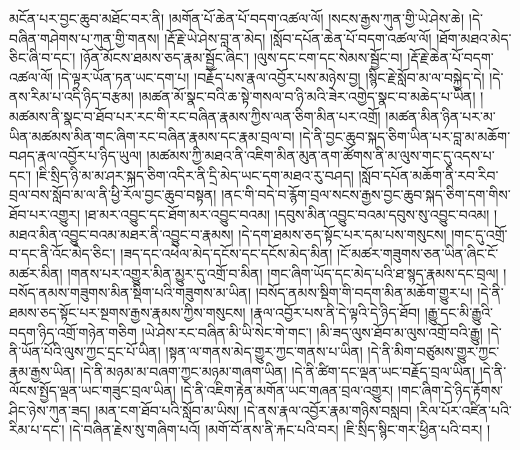 མངོན་པར་བྱང་ཆུབ་མཐོང་བར་ནི། །མགོན་པོ་ཆེན་པོ་བདག་འཚལ་ལོ། །སངས་རྒྱས་ཀུན་གྱི་ཡེ་ཤེས་ཆེ། །དེ་བཞིན་གཤེགས་པ་ཀུན་གྱི་གནས། །རྡོ་རྗེ་ཡེ་ཤེས་བླ་ན་མེད། །སློབ་དཔོན་ཆེན་པོ་བདག་འཚལ་ལོ། །ཐོག་མཐའ་མེད་ཅིང་ཞི་བ་དང་། །ཉོན་མོངས་ཐམས་ཅད་རྣམ་སྦྱོང་ཞིང་། །ལུས་དང་ངག་དང་སེམས་སྦྱོང་བ། །རྡོ་རྗེ་ཆེན་པོ་བདག་འཚལ་ལོ། །དེ་ལྟར་ཡོན་ཏན་ཡང་དག་པ། །བརྗོད་པས་རྣལ་འབྱོར་པས་མཉེས་བྱ། །སྙིང་རྗེ་སློབ་མ་ལ་བསྐྱེད་དེ། །དེ་ནས་རིམ་པ་འདི་ཉིད་བརྩམ། །མཚན་མོ་སྣང་བའི་ཆ་སྟེ་གསལ་བ་ཉི་མའི་ཟེར་འགྱེད་སྣང་བ་མཆེད་པ་ཡིན། །མཚམས་ནི་སྣང་བ་ཐོབ་པར་རང་གི་རང་བཞིན་རྣམས་ཀྱིས་ལན་ཅིག་མིན་པར་འགྲོ། །མཚན་མིན་ཉིན་པར་མ་ཡིན་མཚམས་མིན་གང་ཞིག་རང་བཞིན་རྣམས་དང་རྣམ་བྲལ་བ། །དེ་ནི་བྱང་ཆུབ་སྐད་ཅིག་ཡིན་པར་བླ་མ་མཆོག་བཤད་རྣལ་འབྱོར་པ་ཉིད་ཡུལ། །མཚམས་ཀྱི་མཐའ་ནི་འཇིག་མིན་མུན་ནག་ཚོགས་ནི་མ་ལུས་གང་དུ་འདས་པ་དང་། །ཇི་སྲིད་ཉི་མ་མ་ཤར་སྐད་ཅིག་འདིར་ནི་དྲི་མེད་ཡང་དག་མཐའ་རུ་བཤད། །སློབ་དཔོན་མཆོག་ནི་རབ་རིབ་བྲལ་བས་སློབ་མ་ལ་ནི་ཕྱི་རོལ་བྱང་ཆུབ་བསྟན། །ནང་གི་བདེ་བ་རྙོག་བྲལ་སངས་རྒྱས་བྱང་ཆུབ་སྐད་ཅིག་དག་གིས་ཐོབ་པར་འགྱུར། །ཐ་མར་འབྱུང་དང་ཐོག་མར་འབྱུང་བའམ། །དབུས་མིན་འབྱུང་བའམ་དབུས་སུ་འབྱུང་བའམ། །མཐའ་མིན་འབྱུང་བའམ་མཐར་ནི་འབྱུང་བ་རྣམས། །དེ་དག་ཐམས་ཅད་སྟོང་པར་དམ་པས་གསུངས། །གང་དུ་འགྲོ་བ་དང་ནི་འོང་མེད་ཅིང་། །ཟད་དང་འཕེལ་མེད་དངོས་དང་དངོས་མེད་མིན། །ངོ་མཚར་གཟུགས་ཅན་ཡིན་ཞིང་ངོ་མཚར་མིན། །གནས་པར་འགྱུར་མིན་མྱུར་དུ་འགྲོ་བ་མིན། །གང་ཞིག་ཡོད་དང་མེད་པའི་ཐ་སྙད་རྣམས་དང་བྲལ། །བསོད་ནམས་གཟུགས་མིན་སྡིག་པའི་གཟུགས་མ་ཡིན། །བསོད་ནམས་སྡིག་གི་བདག་མིན་མཆོག་གྱུར་པ། །དེ་ནི་ཐམས་ཅད་སྟོང་པར་སྔགས་རྒྱས་རྣམས་ཀྱིས་གསུངས། །རྣལ་འབྱོར་པས་ནི་དེ་ལྟའི་དེ་ཉིད་ཐོབ། །རྒྱུ་དང་མི་རྒྱུའི་བདག་ཉིད་འགྲོ་གཉེན་གཅིག །ཡེ་ཤེས་རང་བཞིན་མི་ཡི་སེང་གེ་གང་། །མི་ཟད་ལུས་ཐོབ་མ་ལུས་འགྲོ་བའི་རྒྱུ། །དེ་ནི་ཡོན་པོའི་ལུས་ཀྱང་དྲང་པོ་ཡིན། །སྟན་ལ་གནས་མེད་གྱུར་ཀྱང་གནས་པ་ཡིན། །དེ་ནི་མིག་བཙུམས་གྱུར་ཀྱང་རྣམ་རྒྱས་ཡིན། །དེ་ནི་མཉམ་མ་བཞག་ཀྱང་མཉམ་གཞག་ཡིན། །དེ་ནི་ཚིག་དང་ལྡན་ཡང་བརྗོད་བྲལ་ཡིན། །དེ་ནི་ལོངས་སྤྱོད་ལྡན་ཡང་གཟུང་བྲལ་ཡིན། །དེ་ནི་འཇིག་རྟེན་མགོན་ཡང་གཞན་བྲལ་འགྱུར། །གང་ཞིག་དེ་ཉིད་རྟོགས་ཤིང་ཉེས་ཀུན་ཟད། །མན་ངག་ཐོབ་པའི་སློབ་མ་ཡིས། །དེ་ནས་རྣལ་འབྱོར་རྣམ་གཉིས་བསླབ། །རིལ་པོར་འཛིན་པའི་རིམ་པ་དང་། །དེ་བཞིན་རྗེས་སུ་གཞིག་པའོ། །མགོ་བོ་ནས་ནི་རྐང་པའི་བར། །ཇི་སྲིད་སྙིང་གར་ཕྱིན་པའི་བར། །
